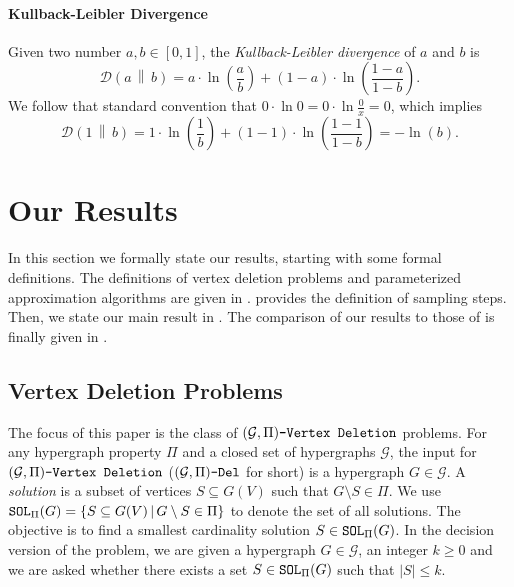 \documentclass[letterpaper,11pt]{article}
\newcommand{\abs}[1]{{\left| #1\right|}}
\newcommand{\1}[1]{\mathds{1}\left[#1\right]}
\newcommand{\sat}{\textnormal{\texttt{SOL}}}
\newcommand{\D}[2]{\mathcal{D}\left(#1\, \middle\|\,#2 \right)}
\newcommand{\gpivd}[1][\mathcal{G},\Pi]{(#1)\textnormal{\texttt{-Vertex Deletion}}}
\newcommand{\sgpivd}[1][\mathcal{G},\Pi]{(#1)\textnormal{\texttt{-Del}}}
\begin{document}
\paragraph{Kullback-Leibler Divergence} Given two number $a,b\in [0,1]$, the {\em Kullback-Leibler divergence} of $a$ and $b$ is 
$$
\D{a}{b} = a\cdot \ln\left(\frac{a}{b}\right)+(1-a)\cdot \ln\left(\frac{1-a}{1-b}\right).
$$
We follow that standard convention that $0\cdot \ln 0 =0\cdot \ln \frac{0}{x}  =0$, which implies
\begin{equation}
	\D{1}{b}=  1\cdot \ln\left( \frac{1}{b}\right) + (1-1) \cdot \ln \left(\frac{1-1}{1-b}\right) = -\ln(b).\label{eq:KL_eq_1}
\end{equation}






 
\section{Our Results}
\label{sec:our_results}

In this section we formally state our results, 
starting with some formal definitions. The definitions of vertex deletion problems and parameterized approximation algorithms are given in .  provides the definition of sampling steps. Then, we state our main result in . The comparison of our results  to those of \cite{Fellows2018} is finally given in . 
\subsection{Vertex Deletion Problems}
\label{sec:prob_def}
The focus of this paper is the class of $\gpivd$ problems. 
For any hypergraph property $\Pi$ and a closed set of hypergraphs $\mathcal{G}$, the input for $\gpivd$ ($\sgpivd$ for short) is a  hypergraph $G \in \mathcal{G}$. A {\em solution} is a subset of vertices $S\subseteq G(V)$  such that $G\setminus S\in \Pi$. 
We use $\sat_{\Pi}(G) = \{ S\subseteq G(V)\,|\,G\setminus S\in \Pi\}$ to denote the set of all solutions. The objective is to find a smallest cardinality solution $S \in \sat_\Pi(G)$.
In the decision version of the problem, we are given a hypergraph $G \in \mathcal{G}$, an integer $k \geq 0$ and we are asked whether there exists a set $S \in \sat_\Pi(G)$ such that $\abs{S} \leq k$.
\end{document}
